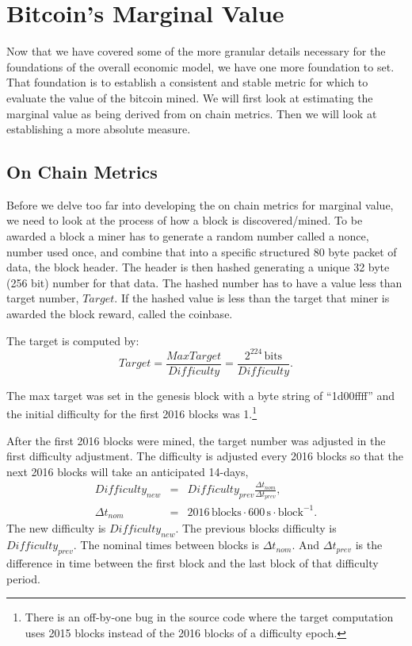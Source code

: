 \documentclass[runningheads]{llncs}
\begin{document}
\section{Bitcoin's Marginal Value}
Now that we have covered some of the more granular details necessary for the foundations of the overall economic model, we have one more foundation to set.
That foundation is to establish a consistent and stable metric for which to evaluate the value of the bitcoin mined.
We will first look at estimating the marginal value as being derived from on chain metrics.
Then we will look at establishing a more absolute measure.

\subsection{On Chain Metrics}
Before we delve too far into developing the on chain metrics for marginal value, we need to look at the process of how a block is discovered/mined.
To be awarded a block a miner has to generate a random number called a nonce, number used once, and combine that into a specific structured 80 byte packet of data, the block header.
The header is then hashed generating a unique 32 byte (256 bit) number for that data.
The hashed number has to have a value less than target number, $Target$.
If the hashed value is less than the target that miner is awarded the block reward, called the coinbase.

The target is computed by:
\begin{equation}
    Target=\frac{MaxTarget}{Difficulty}=\frac{2^{224}\,\textrm{bits}}{Difficulty}. \label{eq:1}
\end{equation}

The max target was set in the genesis block with a byte string of ``1d00ffff'' and the initial difficulty for the first 2016 blocks was 1.\footnote{
    There is an off-by-one bug in the source code where the target computation uses 2015 blocks instead of the 2016 blocks of a difficulty epoch.}

After the first 2016 blocks were mined, the target number was adjusted in the first difficulty adjustment.
The difficulty is adjusted every 2016 blocks so that the next 2016 blocks will take an anticipated 14-days,
\begin{eqnarray}
    Difficulty_{new} & = & Difficulty_{prev}\frac{\Delta t_{nom}}{\Delta t_{prev}}, \label{eq:2} \\
    \Delta t_{nom}   & = & 2016 \,\textrm{blocks} \cdot 600\,\textrm{s} \cdot \textrm{block}^{-1}.
\end{eqnarray}
The new difficulty is $Difficulty_{new}$.
The previous blocks difficulty is $Difficulty_{prev}$.
The nominal times between blocks is $\Delta t_{nom}$.
And $\Delta t_{prev}$ is the difference in time between the first block and the last block of that difficulty period.
\end{document}
